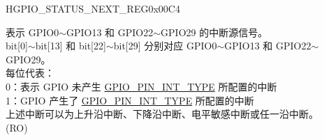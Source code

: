 \begin{register}{H}{GPIO\_STATUS\_NEXT\_REG}{0x00C4}\label{regdesc:GPIOSTATUSNEXTREG}
%
\regnewline%
\begin{regdesc}\begin{reglist}
\label{fielddesc:GPIOSTATUSINTERRUPTNEXT}\item [GPIO\_STATUS\_INTERRUPT\_NEXT] 表示 GPIO0$\sim$GPIO13 和 GPIO22$\sim$GPIO29 的中断源信号。\\bit[0]$\sim$bit[13] 和 bit[22]$\sim$bit[29] 分别对应 GPIO0$\sim$GPIO13 和 GPIO22$\sim$GPIO29。\\
每位代表：\\
0：表示 GPIO 未产生 \hyperref[fielddesc:GPIOPINNINTTYPE]{GPIO\_PIN\_INT\_TYPE} 所配置的中断\\
1：GPIO 产生了 \hyperref[fielddesc:GPIOPINNINTTYPE]{GPIO\_PIN\_INT\_TYPE} 所配置的中断\\
上述中断可以为上升沿中断、下降沿中断、电平敏感中断或任一沿中断。\\ (RO)
\end{reglist}\end{regdesc}
\end{register}


